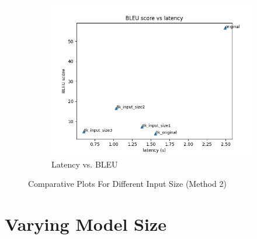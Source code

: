 \documentclass[11pt]{article}
\begin{document}
\begin{figure}[h]
\begin{subfigure}{0.32\textwidth}
        \includegraphics[width=\textwidth]{images/input_size_method2/BLEU_vs_latency.png}
        \caption{Latency vs. BLEU }
    \end{subfigure}
    \caption{\label{fig:input_size_method2}Comparative Plots For Different Input Size (Method 2)}
\end{figure}

\section{Varying Model Size}
\end{document}
